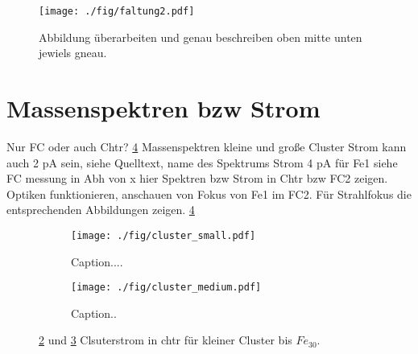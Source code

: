 \begin{figure}
    \centering
    \texttt{[image: ./fig/faltung2.pdf]}
    \caption{Abbildung überarbeiten und genau beschreiben oben mitte unten jewiels gneau.}
    \label{fig:faltung}
\end{figure}


\section{Massenspektren bzw Strom}

Nur FC oder auch Chtr? \ref{fig:cluster_chtr}
Massenspektren kleine und große Cluster
Strom kann auch 2 pA sein, siehe Quelltext, name des Spektrums %
Strom 4 pA für Fe1 siehe FC messung in Abh von x
hier Spektren bzw Strom in Chtr bzw FC2 zeigen. Optiken funktionieren, anschauen von Fokus von Fe1 im FC2.
Für Strahlfokus die entsprechenden Abbildungen zeigen.
\ref{fig:cluster_chtr}

\begin{figure}
    \begin{subfigure}[t]{0.475\textwidth}
      \texttt{[image: ./fig/cluster\_small.pdf]}
      \caption{Caption....}
      \label{fig:cluster_small}
    \end{subfigure}\hfill
    \begin{subfigure}[t]{0.475\textwidth}
      \texttt{[image: ./fig/cluster\_medium.pdf]}
      \caption{Caption..}
      \label{fig:cluster_medium}
    \end{subfigure}
    \caption{\ref{fig:cluster_small} und \ref{fig:cluster_medium} Clsuterstrom in chtr für kleiner Cluster bis $Fe_{30}$.} 
    \label{fig:cluster_chtr}
\end{figure}



